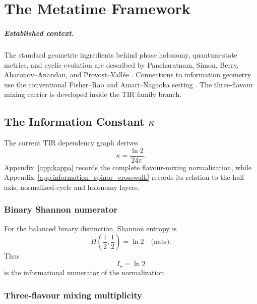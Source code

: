 \chapter{The Metatime Framework}
\label{ch:metatime_framework}

\paragraph{Established context.}
The standard geometric ingredients behind phase holonomy, quantum-state metrics,
and cyclic evolution are described by Pancharatnam, Simon, Berry,
Aharonov--Anandan, and Provost--Vall\'ee
\cite{Pancharatnam1956,Simon1983,berry1984,AharonovAnandan1987,ProvostVallee1980}.
Connections to information geometry use the conventional Fisher--Rao and
Amari--Nagaoka setting \cite{Fisher1925,Rao1945,AmariNagaoka2000}. The
three-flavour mixing carrier is developed inside the TIR family branch.

\section{The Information Constant \(\kappa\)}

The current TIR dependency graph derives
\begin{equation}
\boxed{\kappa=\frac{\ln2}{24\pi}}.
\label{eq:kappa_framework_definition}
\end{equation}
Appendix~\ref{app:kappa} records the complete flavour-mixing normalization,
while Appendix~\ref{app:information_spinor_crosswalk} records its relation to
the half-axis, normalized-cycle and holonomy layers.


\subsection{Binary Shannon numerator}

For the balanced binary distinction, Shannon entropy is \cite{shannon1948}
\begin{equation}
H\!\left(\frac12,\frac12\right)=\ln2
\quad\text{(nats)}.
\label{eq:shannon_binary}
\end{equation}
Thus
\[
\boxed{I_\star=\ln2}
\]
is the informational numerator of the normalization.

\subsection{Three-flavour mixing multiplicity}

